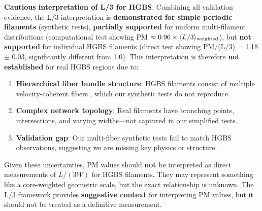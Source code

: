 \documentclass[twoside,twocolumn]{mnras}
\begin{document}
\textbf{Cautious interpretation of L/3 for HGBS}. Combining all validation evidence, the L/3 interpretation is \textbf{demonstrated for simple periodic filaments} (synthetic tests), \textbf{partially supported} for uniform multi-filament distributions (computational test showing PM $\approx 0.96 \times \langle L/3 \rangle_{\rm weighted}$), but \textbf{not supported} for individual HGBS filaments (direct test showing PM/(L/3) = 1.18 $\pm$ 0.03, significantly different from 1.0). This interpretation is therefore \textbf{not established} for real HGBS regions due to:
\begin{enumerate}
    \item \textbf{Hierarchical fiber bundle structure}: HGBS filaments consist of multiple velocity-coherent fibers \citep{Hacar2013, Yang2024}, which our synthetic tests do not reproduce.
    \item \textbf{Complex network topology}: Real filaments have branching points, intersections, and varying widths---not captured in our simplified tests.
    \item \textbf{Validation gap}: Our multi-fiber synthetic tests fail to match HGBS observations, suggesting we are missing key physics or structure.
\end{enumerate}
Given these uncertainties, PM values should \textbf{not} be interpreted as direct measurements of $L/(3W)$ for HGBS filaments. They may represent something like a core-weighted geometric scale, but the exact relationship is unknown. The L/3 framework provides \textbf{suggestive context} for interpreting PM values, but it should not be treated as a definitive measurement.
\end{document}
